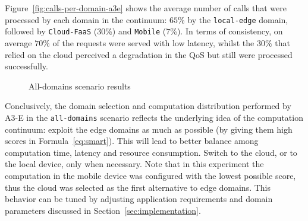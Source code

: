 Figure~\ref{fig:calls-per-domain-a3e} shows the average number of calls that were processed by each domain in the continuum: $65$\% by the \texttt{local-edge} domain, followed by \texttt{Cloud-FaaS} ($30$\%) and \texttt{Mobile} ($7$\%). In terms of consistency, on average $70\%$ of the requests were served with low latency, whilst the $30\%$ that relied on the cloud perceived a degradation in the QoS but still were processed successfully.
 
\begin{figure}[htb]
	\raggedright

	\captionsetup[subfigure]{width=0.45\textwidth}
	\captionsetup[subfigure]{width=0.45\textwidth}
	
	\caption{All-domains scenario results} \label{fig:all-domains}
\end{figure}

Conclusively, the domain selection and computation distribution performed by A3-E in the \texttt{all-domains} scenario reflects the underlying idea of the computation continuum: exploit the edge domains as much as possible (by giving them high scores in Formula~\ref{eq:smart}). This will lead to better balance among computation time, latency and resource consumption. Switch to the cloud, or to the local device, only when necessary. Note that in this experiment the computation in the mobile device was configured with the lowest possible score, thus the cloud was selected as the first alternative to edge domains. This behavior can be tuned by adjusting application requirements and domain parameters discussed in Section~\ref{sec:implementation}.

